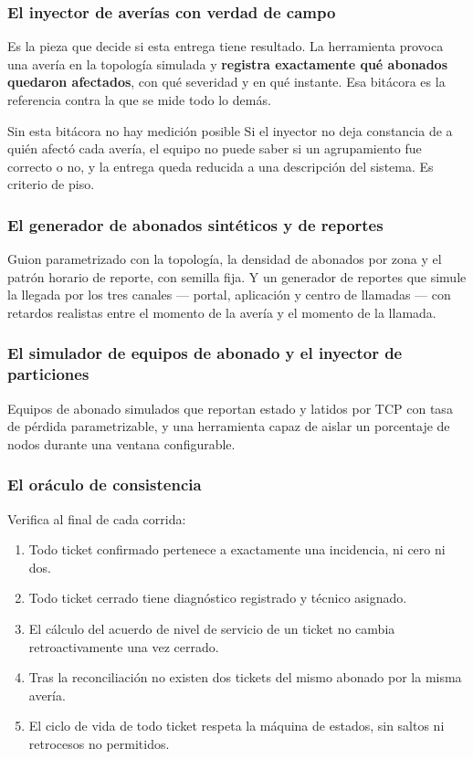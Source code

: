 \documentclass[11pt,a4paper]{article}
\begin{document}
	\subsubsection{El inyector de averías con verdad de campo}
	
	Es la pieza que decide si esta entrega tiene resultado. La herramienta provoca una avería en la topología simulada y \textbf{registra exactamente qué abonados quedaron afectados}, con qué severidad y en qué instante. Esa bitácora es la referencia contra la que se mide todo lo demás.
	
	\begin{avisoBox}{Sin esta bitácora no hay medición posible}
		Si el inyector no deja constancia de a quién afectó cada avería, el equipo no puede saber si un agrupamiento fue correcto o no, y la entrega queda reducida a una descripción del sistema. Es criterio de piso.
	\end{avisoBox}
	
	\subsubsection{El generador de abonados sintéticos y de reportes}
	
	Guion parametrizado con la topología, la densidad de abonados por zona y el patrón horario de reporte, con semilla fija. Y un generador de reportes que simule la llegada por los tres canales --- portal, aplicación y centro de llamadas --- con retardos realistas entre el momento de la avería y el momento de la llamada.
	
	\subsubsection{El simulador de equipos de abonado y el inyector de particiones}
	
	Equipos de abonado simulados que reportan estado y latidos por TCP con tasa de pérdida parametrizable, y una herramienta capaz de aislar un porcentaje de nodos durante una ventana configurable.
	
	\subsubsection{El oráculo de consistencia}
	
	Verifica al final de cada corrida:
	
	\begin{enumerate}[leftmargin=*,itemsep=2pt]
		\item Todo ticket confirmado pertenece a exactamente una incidencia, ni cero ni dos.
		\item Todo ticket cerrado tiene diagnóstico registrado y técnico asignado.
		\item El cálculo del acuerdo de nivel de servicio de un ticket no cambia retroactivamente una vez cerrado.
		\item Tras la reconciliación no existen dos tickets del mismo abonado por la misma avería.
		\item El ciclo de vida de todo ticket respeta la máquina de estados, sin saltos ni retrocesos no permitidos.
	\end{enumerate}
	
\end{document}
